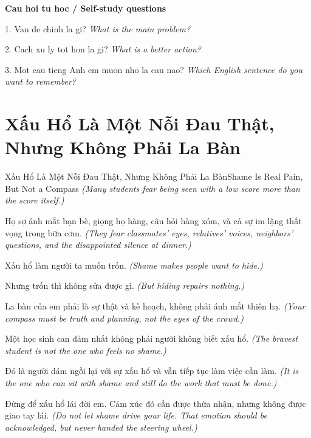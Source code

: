\begin{tuhocnhanh}
\textbf{Cau hoi tu hoc / Self-study questions}

1. Van de chinh la gi? \textit{What is the main problem?}

2. Cach xu ly tot hon la gi? \textit{What is a better action?}

3. Mot cau tieng Anh em muon nho la cau nao? \textit{Which English sentence do you want to remember?}
\end{tuhocnhanh}
\ngancach

\section{Xấu Hổ Là Một Nỗi Đau Thật, Nhưng Không Phải La Bàn}
\begin{truyen}{Xấu Hổ Là Một Nỗi Đau Thật, Nhưng Không Phải La Bàn}{Shame Is Real Pain, But Not a Compass}
\textit{(Many students fear being seen with a low score more than the score itself.)}

Họ sợ ánh mắt bạn bè, giọng họ hàng, câu hỏi hàng xóm, và cả sự im lặng thất vọng trong bữa cơm.
\textit{(They fear classmates’ eyes, relatives’ voices, neighbors’ questions, and the disappointed silence at dinner.)}

Xấu hổ làm người ta muốn trốn.
\textit{(Shame makes people want to hide.)}

Nhưng trốn thì không sửa được gì.
\textit{(But hiding repairs nothing.)}

La bàn của em phải là sự thật và kế hoạch, không phải ánh mắt thiên hạ.
\textit{(Your compass must be truth and planning, not the eyes of the crowd.)}

Một học sinh can đảm nhất không phải người không biết xấu hổ.
\textit{(The bravest student is not the one who feels no shame.)}

Đó là người dám ngồi lại với sự xấu hổ và vẫn tiếp tục làm việc cần làm.
\textit{(It is the one who can sit with shame and still do the work that must be done.)}

\end{truyen}

\begin{baihoc}
Đừng để xấu hổ lái đời em. Cảm xúc đó cần được thừa nhận, nhưng không được giao tay lái.
\textit{(Do not let shame drive your life. That emotion should be acknowledged, but never handed the steering wheel.)}
\end{baihoc}

